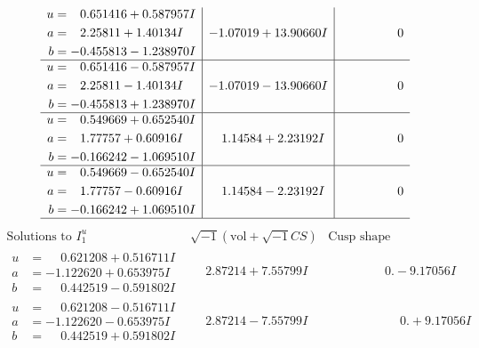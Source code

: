 \documentclass[1p]{elsarticle_modified}
\theoremstyle{definition}
\newcommand{\I}{\sqrt{-1}}
\begin{document}
$$\begin{array}{c|c|c}
\begin{aligned}
u &= \phantom{-}0.651416 + 0.587957 I \\
a &= \phantom{-}2.25811 + 1.40134 I \\
b &= -0.455813 - 1.238970 I\end{aligned}
 & -1.07019 + 13.90660 I & \phantom{-0.000000 } 0 \\ \hline\begin{aligned}
u &= \phantom{-}0.651416 - 0.587957 I \\
a &= \phantom{-}2.25811 - 1.40134 I \\
b &= -0.455813 + 1.238970 I\end{aligned}
 & -1.07019 - 13.90660 I & \phantom{-0.000000 } 0 \\ \hline\begin{aligned}
u &= \phantom{-}0.549669 + 0.652540 I \\
a &= \phantom{-}1.77757 + 0.60916 I \\
b &= -0.166242 - 1.069510 I\end{aligned}
 & \phantom{-}1.14584 + 2.23192 I & \phantom{-0.000000 } 0 \\ \hline\begin{aligned}
u &= \phantom{-}0.549669 - 0.652540 I \\
a &= \phantom{-}1.77757 - 0.60916 I \\
b &= -0.166242 + 1.069510 I\end{aligned}
 & \phantom{-}1.14584 - 2.23192 I & \phantom{-0.000000 } 0\\
 \hline 
 \end{array}$$\newpage$$\begin{array}{c|c|c}  
\text{Solutions to }I^u_{1}& \I (\text{vol} + \sqrt{-1}CS) & \text{Cusp shape}\\
 \hline 
\begin{aligned}
u &= \phantom{-}0.621208 + 0.516711 I \\
a &= -1.122620 + 0.653975 I \\
b &= \phantom{-}0.442519 - 0.591802 I\end{aligned}
 & \phantom{-}2.87214 + 7.55799 I & \phantom{-0.000000 } 0. - 9.17056 I \\ \hline\begin{aligned}
u &= \phantom{-}0.621208 - 0.516711 I \\
a &= -1.122620 - 0.653975 I \\
b &= \phantom{-}0.442519 + 0.591802 I\end{aligned}
 & \phantom{-}2.87214 - 7.55799 I & \phantom{-0.000000 -}0. + 9.17056 I \\ \hline\begin{aligned}

\end{aligned}
\end{array}$$
\end{document}
